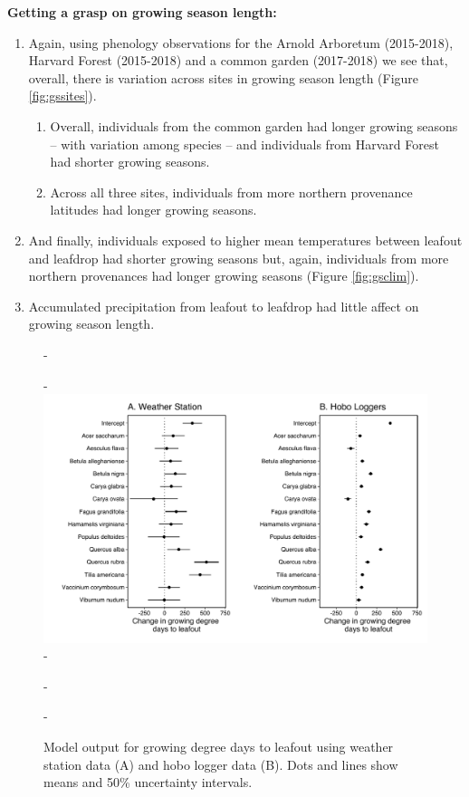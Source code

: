 \documentclass{article}\usepackage[]{graphicx}\usepackage[]{color}
\begin{document}
{\large{\textbf{Getting a grasp on growing season length:}}
\begin{enumerate}
\item Again, using phenology observations for the Arnold Arboretum (2015-2018), Harvard Forest (2015-2018) and a common garden (2017-2018) we see that, overall, there is variation across sites in growing season length (Figure \ref{fig:gssites}). 
  \begin{enumerate}
  \item Overall, individuals from the common garden had longer growing seasons -- with variation among species -- and individuals from Harvard Forest had shorter growing seasons.
  \item Across all three sites, individuals from more northern provenance latitudes had longer growing seasons. 
  \end{enumerate}
\item And finally, individuals exposed to higher mean temperatures between leafout and leafdrop had shorter growing seasons but, again, individuals from more northern provenances had longer growing seasons (Figure \ref{fig:gsclim}). 
\item Accumulated precipitation from leafout to leafdrop had little affect on growing season length.
\end{enumerate}

{\begin{figure} [H]
  -\begin{center}
  -\includegraphics[width=16cm]{..//analyses/figures/muplot_compare_lo.pdf}
  -\caption{Model output for growing degree days to leafout using weather station data (A) and hobo logger data (B). Dots and lines show means and 50\% uncertainty intervals.}\label{fig:compare}
  -\end{center}
  -\end{figure}}
  
}
\end{document}
